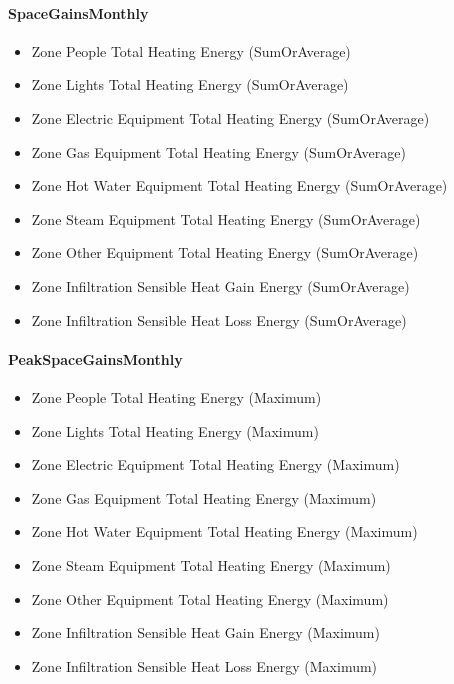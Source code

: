 \paragraph{SpaceGainsMonthly}\label{spacegainsmonthly}

\begin{itemize}
\item
  Zone People Total Heating Energy (SumOrAverage)
\item
  Zone Lights Total Heating Energy (SumOrAverage)
\item
  Zone Electric Equipment Total Heating Energy (SumOrAverage)
\item
  Zone Gas Equipment Total Heating Energy (SumOrAverage)
\item
  Zone Hot Water Equipment Total Heating Energy (SumOrAverage)
\item
  Zone Steam Equipment Total Heating Energy (SumOrAverage)
\item
  Zone Other Equipment Total Heating Energy (SumOrAverage)
\item
  Zone Infiltration Sensible Heat Gain Energy (SumOrAverage)
\item
  Zone Infiltration Sensible Heat Loss Energy (SumOrAverage)
\end{itemize}

\paragraph{PeakSpaceGainsMonthly}\label{peakspacegainsmonthly}

\begin{itemize}
\item
  Zone People Total Heating Energy (Maximum)
\item
  Zone Lights Total Heating Energy (Maximum)
\item
  Zone Electric Equipment Total Heating Energy (Maximum)
\item
  Zone Gas Equipment Total Heating Energy (Maximum)
\item
  Zone Hot Water Equipment Total Heating Energy (Maximum)
\item
  Zone Steam Equipment Total Heating Energy (Maximum)
\item
  Zone Other Equipment Total Heating Energy (Maximum)
\item
  Zone Infiltration Sensible Heat Gain Energy (Maximum)
\item
  Zone Infiltration Sensible Heat Loss Energy (Maximum)
\end{itemize}

